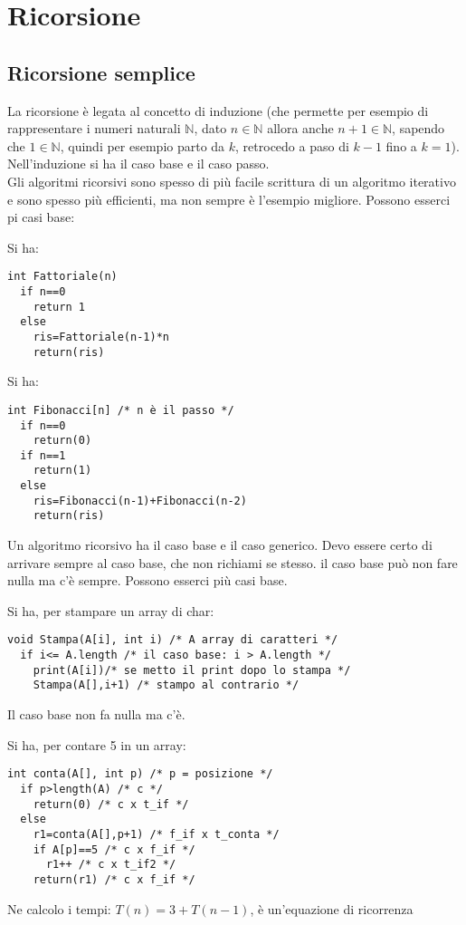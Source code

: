 \documentclass[a4paper,12pt,oneside,tikz]{book}
\begin{document}
\chapter{Ricorsione}
\section{Ricorsione semplice}
La ricorsione è legata al concetto di induzione (che permette per esempio di rappresentare i numeri naturali $ \mathbb{N}$, dato $n\in\mathbb{N}$ allora anche $n+1\in\mathbb{N}$, sapendo che $1\in\mathbb{N}$, quindi per esempio parto da $k$, retrocedo a paso di $k-1$ fino a $k=1$). Nell'induzione si ha il caso base e il caso passo. \\
Gli algoritmi ricorsivi sono spesso di più facile scrittura di un algoritmo iterativo e sono spesso più efficienti, ma non sempre è l'esempio migliore. Possono esserci pi casi base:
\begin{esempio}[Fattoriale]
	Si ha:
	\begin{verbatim}
int Fattoriale(n)
  if n==0
    return 1
  else 
    ris=Fattoriale(n-1)*n
    return(ris)
\end{verbatim}
\end{esempio}
\newpage
\begin{esempio}[Fibonacci]
	Si ha:
	\begin{verbatim}
int Fibonacci[n] /* n è il passo */
  if n==0
    return(0)
  if n==1
    return(1)
  else 
    ris=Fibonacci(n-1)+Fibonacci(n-2)
    return(ris)
\end{verbatim}
\end{esempio}
Un algoritmo ricorsivo ha il caso base e il caso generico. Devo essere certo di arrivare sempre al caso base, che non richiami se stesso. il caso base può non fare nulla ma c'è sempre. Possono esserci più casi base.
\begin{esempio}
	Si ha, per stampare un array di char:
	\begin{verbatim}
void Stampa(A[i], int i) /* A array di caratteri */
  if i<= A.length /* il caso base: i > A.length */
    print(A[i])/* se metto il print dopo lo stampa */
    Stampa(A[],i+1) /* stampo al contrario */
\end{verbatim}
	Il caso base non fa nulla ma c'è.
\end{esempio}
\begin{esempio}
	Si ha, per contare 5 in un array:
	\begin{verbatim}
int conta(A[], int p) /* p = posizione */
  if p>length(A) /* c */
    return(0) /* c x t_if */
  else
    r1=conta(A[],p+1) /* f_if x t_conta */
    if A[p]==5 /* c x f_if */
      r1++ /* c x t_if2 */
    return(r1) /* c x f_if */
\end{verbatim}
	Ne calcolo i tempi:
	$T(n)=3+T(n-1)$, è un'equazione di ricorrenza
\end{esempio}
\end{document}
